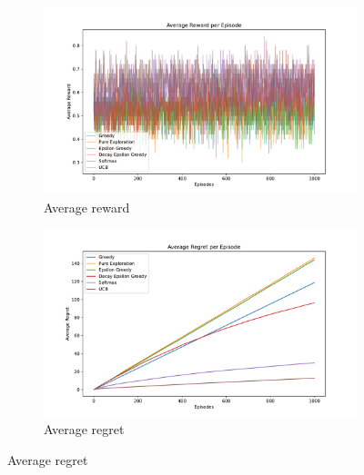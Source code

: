 \begin{enumerate}
    \begin{figure}[h]
        \centering
        \begin{subfigure}[b]{0.3\textwidth}
            \includegraphics[width=\textwidth]{images/mab/bernoulli_average_reward_per_episode.pdf}
            \caption{Average reward}
            \label{fig:bernoulli_reward}
        \end{subfigure}

        \begin{subfigure}[b]{0.3\textwidth}
            \includegraphics[width=\textwidth]{images/mab/bernoulli_average_regret_per_episode.pdf}
            \caption{Average regret}
            \label{fig:bernoulli_regret}
        \end{subfigure}


\end{figure}
\end{enumerate}
